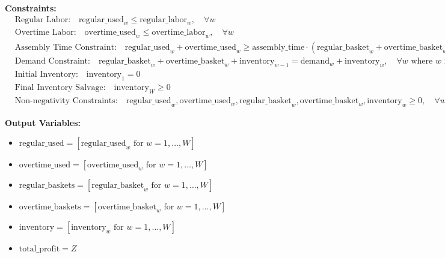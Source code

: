 \documentclass{article}
\begin{document}
\textbf{Constraints:}
\begin{align*}
    & \text{Regular Labor:} \quad \text{regular\_used}_w \leq \text{regular\_labor}_w, \quad \forall w \\
    & \text{Overtime Labor:} \quad \text{overtime\_used}_w \leq \text{overtime\_labor}_w, \quad \forall w \\
    & \text{Assembly Time Constraint:} \quad \text{regular\_used}_w + \text{overtime\_used}_w \geq \text{assembly\_time} \cdot (\text{regular\_basket}_w + \text{overtime\_basket}_w), \quad \forall w \\
    & \text{Demand Constraint:} \quad \text{regular\_basket}_w + \text{overtime\_basket}_w + \text{inventory}_{w-1} = \text{demand}_w + \text{inventory}_w, \quad \forall w \text{ where } w > 1 \\
    & \text{Initial Inventory:} \quad \text{inventory}_1 = 0 \\
    & \text{Final Inventory Salvage:} \quad \text{inventory}_W \geq 0 \\
    & \text{Non-negativity Constraints:} \quad \text{regular\_used}_w, \text{overtime\_used}_w, \text{regular\_basket}_w, \text{overtime\_basket}_w, \text{inventory}_w \geq 0, \quad \forall w
\end{align*}

\textbf{Output Variables:}
\begin{itemize}
    \item \( \text{regular\_used} = [\text{regular\_used}_w \text{ for } w = 1, \ldots, W] \)
    \item \( \text{overtime\_used} = [\text{overtime\_used}_w \text{ for } w = 1, \ldots, W] \)
    \item \( \text{regular\_baskets} = [\text{regular\_basket}_w \text{ for } w = 1, \ldots, W] \)
    \item \( \text{overtime\_baskets} = [\text{overtime\_basket}_w \text{ for } w = 1, \ldots, W] \)
    \item \( \text{inventory} = [\text{inventory}_w \text{ for } w = 1, \ldots, W] \)
    \item \( \text{total\_profit} = Z \)
\end{itemize}
\end{document}
